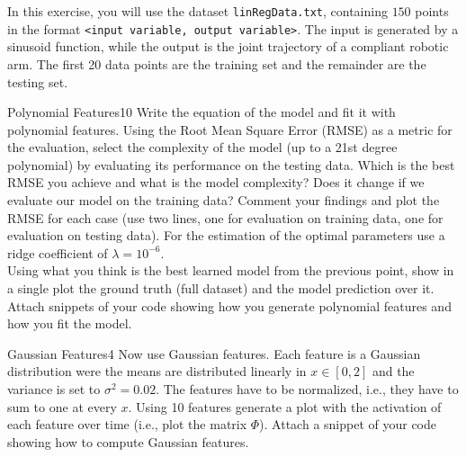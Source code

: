 \newif\ifvimbug
\vimbugfalse

\ifvimbug

\fi


In this exercise, you will use the dataset \texttt{linRegData.txt}, containing $150$ points in the format \texttt{<input variable, output variable>}. The input is generated by a sinusoid function, while the output is the joint trajectory of a compliant robotic arm. 
The first 20 data points are the training set and the remainder are the testing set.

\begin{questions}


\begin{question}{Polynomial Features}{10}
Write the equation of the model and fit it with polynomial features. Using the Root Mean Square Error (RMSE) as a metric for the evaluation, select the complexity of the model (up to a 21st degree polynomial) by evaluating its performance on the testing data. Which is the best RMSE you achieve and what is the model complexity? Does it change if we evaluate our model on the training data? Comment your findings and plot the RMSE for each case (use two lines, one for evaluation on training data, one for evaluation on testing data).
For the estimation of the optimal parameters use a ridge coefficient of $\lambda=10^{-6}$.
\\Using what you think is the best learned model from the previous point, show in a single plot the ground truth (full dataset) and the model prediction over it.
Attach snippets of your code showing how you generate polynomial features and how you fit the model.

\begin{answer}\end{answer}

\end{question}


\begin{question}{Gaussian Features}{4}
Now use Gaussian features. Each feature is a Gaussian distribution were the means are distributed linearly in $x \in[0,2]$ and the variance is set to $\sigma^2=0.02$. The features have to be normalized, i.e., they have to sum to one at every $x$. Using 10 features generate a plot with the activation of each feature over time (i.e., plot the matrix $\Phi$). Attach a snippet of your code showing how to compute Gaussian features.


\end{question}
\end{questions}
